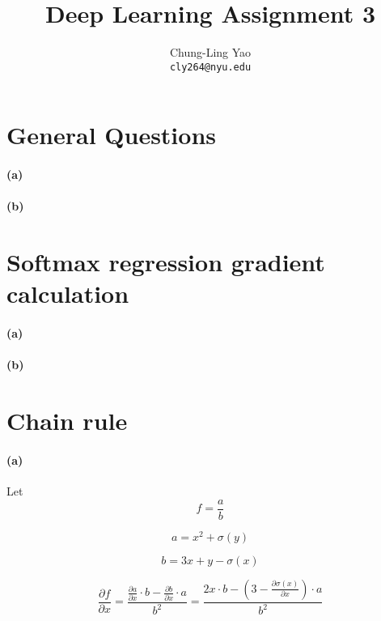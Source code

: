 \documentclass{article}
\title{Deep Learning Assignment 3}
\author{
  Chung-Ling Yao \\
  \texttt{cly264@nyu.edu} \\
}
\begin{document}

\maketitle

\section{General Questions}

\paragraph{(a)}

\paragraph{(b)}


\section{Softmax regression gradient calculation}
\paragraph{(a)}
\paragraph{(b)}

\section{Chain rule}
\paragraph{(a)}
Let
\begin{equation}
f = \frac{a}{b} 
\end{equation}

\begin{equation}
a = x^2 + \sigma{(y)}
\end{equation}

\begin{equation}
b = 3x + y - \sigma{(x)}
\end{equation}

\begin{equation}
\frac{\partial f}{\partial x} 
= \frac{\frac{\partial a}{\partial x} \cdot b - \frac{\partial b}{\partial x} \cdot a }{b^2}  
= \frac{2x \cdot b - (3 - \frac{\partial \sigma{(x)}}{\partial x}) \cdot a}{b^2}
\end{equation}
\end{document}
